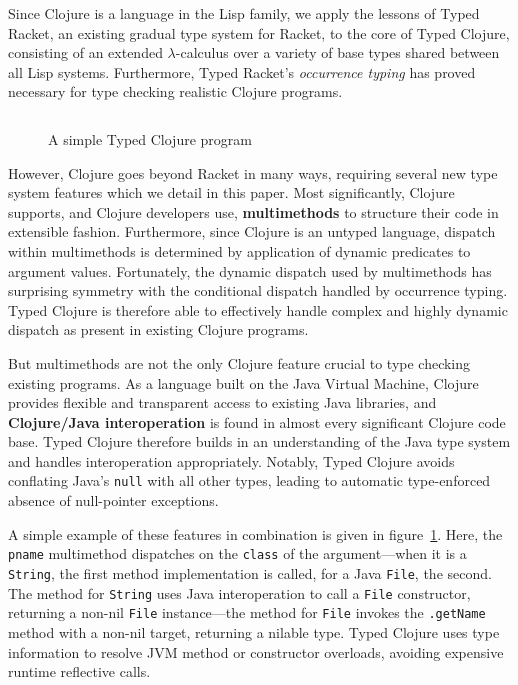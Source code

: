 Since Clojure is a language in the
Lisp family, we apply the lessons of Typed Racket, an existing gradual type
system for Racket, to the core of Typed Clojure, consisting of an extended
$\lambda$-calculus over a variety of base types shared between all Lisp systems.
%
Furthermore, Typed Racket's \emph{occurrence typing} has proved
necessary for type checking realistic Clojure programs.

\begin{figure}[t!]
\inputminted[firstline=15]{clojure}{code/demo/src/demo/ex-intro.clj}
\caption{A simple Typed Clojure program}
\label{fig:ex1}
\end{figure}


However, Clojure goes beyond Racket in many ways, requiring several
new type system features which we detail in this paper.
%
Most significantly, Clojure supports, and Clojure developers use,
\textbf{multimethods} to structure their code in extensible
fashion. Furthermore, since Clojure is an untyped language, dispatch
within multimethods is determined by application of dynamic predicates
to argument values. 
%
Fortunately, the dynamic dispatch used by multimethods has surprising
symmetry with the conditional dispatch handled by occurrence
typing. Typed Clojure is therefore able to effectively handle complex
and highly dynamic dispatch as present in existing Clojure programs. 

But multimethods are not the only Clojure feature crucial to type
checking existing programs. As a language built on the Java Virtual
Machine, Clojure provides flexible and transparent access to existing
Java libraries, and \textbf{Clojure/Java interoperation} is found in almost
every significant Clojure code base. Typed Clojure therefore builds in
an understanding of the Java type system and handles interoperation
appropriately. Notably, Typed Clojure avoids conflating Java's
\texttt{null} with all other types, leading to automatic type-enforced
absence of null-pointer exceptions.

A simple example of these features in combination is given in
figure~\ref{fig:ex1}. Here, the \texttt{pname} multimethod dispatches
on the \texttt{class} of the argument---when it is a \texttt{String},
the first method implementation is called, for a Java \texttt{File}, the
second. The method for \texttt{String} uses Java interoperation
to call a \texttt{File} constructor, returning a non-nil \texttt{File} instance---the 
method for \texttt{File} invokes
the \texttt{.getName} method with a non-nil target, returning a nilable
type. Typed Clojure uses type information to resolve JVM method or constructor overloads,
avoiding expensive runtime reflective calls.


